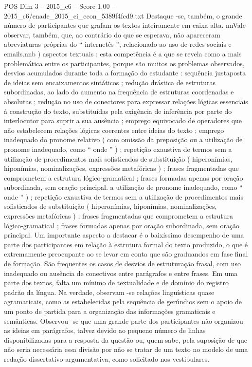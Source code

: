 \begin{textsample}{POS Dim 3 – 2015\_c6 – Score 1.00 – 2015\_c6/enade\_2015\_ci\_econ\_5389f4fcd9.txt}
Destaque -se, também, o grande número de participantes que grafam os textos inteiramente em caixa alta. nnVale observar, também, que, ao contrário do que se esperava, não apareceram abreviaturas próprias do “ internetês ”, relacionado ao uso de redes sociais e emails.nnb ) aspectos textuais : esta competência é a que se revela como a mais problemática entre os participantes, porque são muitos os problemas observados, desvios acumulados durante toda a formação do estudante : sequência justaposta de ideias sem encaixamentos sintáticos ; redução drástica de estruturas subordinadas, ao lado do aumento na frequência de estruturas coordenadas e absolutas ; redução no uso de conectores para expressar relações lógicas essenciais à construção do texto, substituídas pela exigência de inferência por parte do interlocutor para suprir a sua ausência ; emprego equivocado de operadores que não estabelecem relações lógicas coerentes entre ideias do texto ; emprego inadequado do pronome relativo ( com omissão da preposição ou a utilização de pronome inadequado, como “ onde ” ) ; repetição exaustiva de termos sem a utilização de procedimentos mais sofisticados de substituição ( hiperonímias, hiponímias, nominalizações, expressões metafóricas ) ; frases fragmentadas que comprometem a estrutura lógico-gramatical ; frases formadas apenas por oração subordinada, sem oração principal. a utilização de pronome inadequado, como “ onde ” ) ; repetição exaustiva de termos sem a utilização de procedimentos mais sofisticados de substituição ( hiperonímias, hiponímias, nominalizações, expressões metafóricas ) ; frases fragmentadas que comprometem a estrutura lógico-gramatical ; frases formadas apenas por oração subordinada, sem oração principal.
Um importante aspecto a destacar é o baixíssimo desempenho de uma parte dos participantes em relação à estrutura formal do texto produzido, o que é extremamente preocupante ao se levar em conta que são graduandos em fase final de formação.
São frequentes os casos de desvios de estruturação frasal, com uso inadequado ou ausência de conectivos entre parágrafos e entre frases.
Em uma parte dos textos, falta um mínimo de textualidade e de domínio do registro padrão da língua.
Na verdade, observam -se relações linguísticas quase agramaticais, como as estabelecidas pela sequência de gerúndios sem o apoio de um ponto de partida para a organização das informações gramaticais e semânticas.
Observou -se que uma grande parte dos participantes não organizou as ideias em parágrafos, talvez devido ao pequeno número de linhas disponibilizadas para a resposta da questão ou, quem sabe, pela suposição de que não seria necessária essa divisão por não se tratar de um texto no modelo de uma redação dissertativo-argumentativa, como solicitado nos vestibulares.

\end{textsample}
